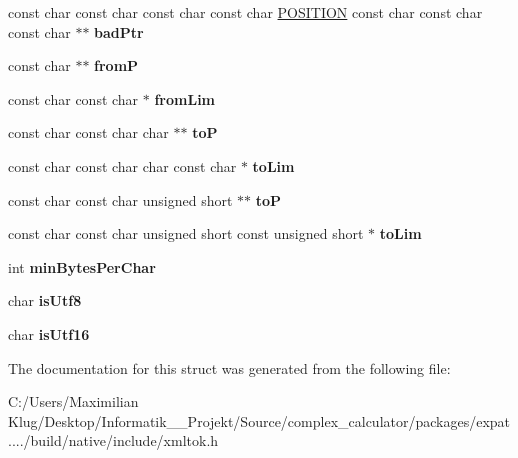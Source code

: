 \begin{DoxyCompactItemize}
\item 
\mbox{\label{structencoding_a3842477d4481d822ee608c01b1d99e16}} 
const char const char const char const char \mbox{\hyperlink{structposition}{P\+O\+S\+I\+T\+I\+ON}} const char const char const char $\ast$$\ast$ {\bfseries bad\+Ptr}
\item 
\mbox{\label{structencoding_a360cf1537ca9bd86b123b8b323fe8433}} 
const char $\ast$$\ast$ {\bfseries fromP}
\item 
\mbox{\label{structencoding_a51d2a830b3a5f30129f7140209e6800f}} 
const char const char $\ast$ {\bfseries from\+Lim}
\item 
\mbox{\label{structencoding_ab10b959825711c5280c0f9cc2a491c5d}} 
const char const char char $\ast$$\ast$ {\bfseries toP}
\item 
\mbox{\label{structencoding_ad121e4388d5369e25c2d8e5f2d0bc036}} 
const char const char char const char $\ast$ {\bfseries to\+Lim}
\item 
\mbox{\label{structencoding_af00d6198ca0eb6034520f814d6972dfd}} 
const char const char unsigned short $\ast$$\ast$ {\bfseries toP}
\item 
\mbox{\label{structencoding_a9f2d8e508359a95de3a19e34da249fd8}} 
const char const char unsigned short const unsigned short $\ast$ {\bfseries to\+Lim}
\item 
\mbox{\label{structencoding_a8eb3388eddb82277ff63c992153f3595}} 
int {\bfseries min\+Bytes\+Per\+Char}
\item 
\mbox{\label{structencoding_a0d05507753831ee4427cd797668957bc}} 
char {\bfseries is\+Utf8}
\item 
\mbox{\label{structencoding_a6990f83527cc7262bb17809aab156a9e}} 
char {\bfseries is\+Utf16}
\end{DoxyCompactItemize}


The documentation for this struct was generated from the following file\+:\begin{DoxyCompactItemize}
\item 
C\+:/\+Users/\+Maximilian Klug/\+Desktop/\+Informatik\+\_\+\_\+\+Projekt/\+Source/complex\+\_\+calculator/packages/expat..../build/native/include/xmltok.\+h\end{DoxyCompactItemize}
